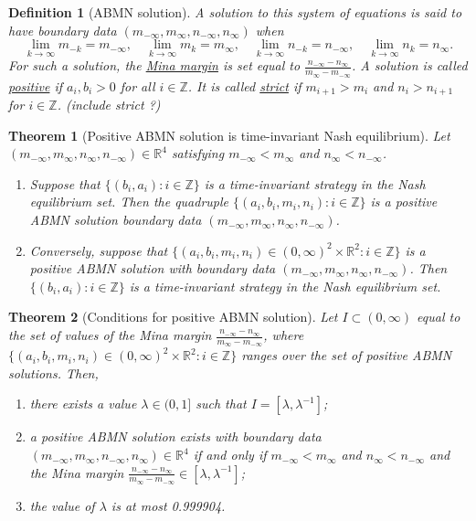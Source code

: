 \documentclass{article}
\newtheorem{theorem}{Theorem}
\newtheorem{definition}{Definition}
\newcommand*{\R}{\mathbb{R}}
\newcommand*{\Z}{\mathbb{Z}}
\begin{document}
\begin{definition}[ABMN solution]
    A solution to this system of equations is said to have boundary data $(m_{-\infty}, m_{\infty},
    n_{-\infty}, n_{\infty})$ when 
    $$\lim_{k\to\infty}m_{-k}=m_{-\infty}, \quad \lim_{k\to\infty}m_{k}=m_{\infty}, \quad
    \lim_{k\to\infty}n_{-k}=n_{-\infty}, \quad \lim_{k\to\infty}n_{k}=n_{\infty}.$$ For such a
    solution, the \underline{Mina margin} is set equal to
    $\frac{n_{-\infty}-n_{\infty}}{m_{\infty}-m_{-\infty}}$. A solution is called
    \underline{positive} if $a_i, b_i >0$ for all $i\in\mathbb{Z}$. It is called \underline{strict}
    if $m_{i+1}>m_i$ and $n_i>n_{i+1}$ for $i\in\mathbb{Z}$. (include strict ?)
\end{definition}

\begin{theorem}[Positive ABMN solution is time-invariant Nash equilibrium]
    Let $(m_{-\infty},m_{\infty},n_{\infty},n_{-\infty})\in\R^4$ satisfying $m_{-\infty}<m_\infty$
    and $n_\infty<n_{-\infty}$.
    \begin{enumerate}[label=(\arabic*)]
        \item Suppose that $\{(b_i, a_i):i\in\Z\}$ is a time-invariant strategy in the Nash
        equilibrium set. Then the quadruple $\{(a_i,b_i,m_i,n_i):i\in\Z\}$ is a positive ABMN
        solution boundary data $(m_{-\infty},m_{\infty},n_{\infty},n_{-\infty})$.
        \item Conversely, suppose that $\{(a_i,b_i,m_i,n_i)\in(0,\infty)^2\times\R^2:i\in\Z\}$ is a
        positive ABMN solution with boundary data $(m_{-\infty},m_{\infty},n_{\infty},n_{-\infty})$.
        Then $\{(b_i,a_i):i\in\Z\}$ is a time-invariant strategy in the Nash equilibrium set.
    \end{enumerate}
\end{theorem}

\begin{theorem}[Conditions for positive ABMN solution]
    Let $I\subset (0,\infty)$ equal to the set of values of the Mina margin
    $\frac{n_{-\infty}-n_{\infty}}{m_{\infty}-m_{-\infty}}$, where $\{(a_i, b_i, m_i,
    n_i)\in(0,\infty)^2\times \R^2:i\in\mathbb{Z}\}$ ranges over the set of positive ABMN solutions.
    Then,
    \begin{enumerate}[label=(\arabic*)]
        \item there exists a value $\lambda\in(0,1]$ such that $I = [\lambda, \lambda^{-1}]$;
        \item a positive ABMN solution exists with boundary data $(m_{-\infty}, m_{\infty},
        n_{-\infty}, n_{\infty})\in\R^4$ if and only if $m_{-\infty}<m_{\infty}$ and $n_{\infty} <
        n_{-\infty}$ and the Mina margin
        $\frac{n_{-\infty}-n_{\infty}}{m_{\infty}-m_{-\infty}}\in[\lambda, \lambda^{-1}]$;
        \item the value of $\lambda$ is at most 0.999904.
    \end{enumerate}
\end{theorem}
\end{document}
